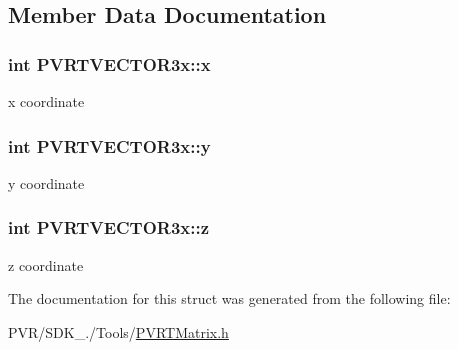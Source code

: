 \subsection{Member Data Documentation}
\hypertarget{struct_p_v_r_t_v_e_c_t_o_r3x_a2f8278926a5d4fbf020e5e03aa046be6}{
\subsubsection[{x}]{\setlength{\rightskip}{0pt plus 5cm}int P\+V\+R\+T\+V\+E\+C\+T\+O\+R3x\+::x}}\label{struct_p_v_r_t_v_e_c_t_o_r3x_a2f8278926a5d4fbf020e5e03aa046be6}
x coordinate \hypertarget{struct_p_v_r_t_v_e_c_t_o_r3x_ad747dd88f70118bd73ed854c885676ed}{
\subsubsection[{y}]{\setlength{\rightskip}{0pt plus 5cm}int P\+V\+R\+T\+V\+E\+C\+T\+O\+R3x\+::y}}\label{struct_p_v_r_t_v_e_c_t_o_r3x_ad747dd88f70118bd73ed854c885676ed}
y coordinate \hypertarget{struct_p_v_r_t_v_e_c_t_o_r3x_a7d289f9391dd17d64b567db573e06e65}{
\subsubsection[{z}]{\setlength{\rightskip}{0pt plus 5cm}int P\+V\+R\+T\+V\+E\+C\+T\+O\+R3x\+::z}}\label{struct_p_v_r_t_v_e_c_t_o_r3x_a7d289f9391dd17d64b567db573e06e65}
z coordinate 

The documentation for this struct was generated from the following file\+:\begin{DoxyCompactItemize}
\item 
P\+V\+R/\+S\+D\+K\+\_./\+Tools/\hyperlink{_p_v_r_t_matrix_8h}{P\+V\+R\+T\+Matrix.\+h}\end{DoxyCompactItemize}

